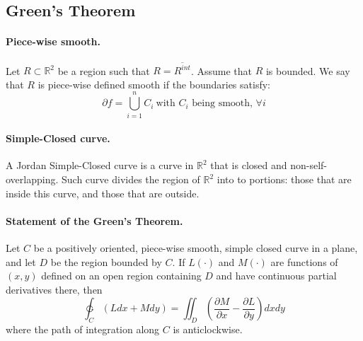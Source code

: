 \documentclass[11pt]{article}
\newcommand{\real}[0]{\mathbb{R}}
\begin{document}
\subsection{Green's Theorem}
\paragraph{Piece-wise smooth.}
Let $R\subset \real^2$ be a region such that $R = \overline{R^{int}}$. Assume that $R$ is bounded. We say that $R$ is piece-wise defined smooth if the boundaries satisfy:
\begin{equation*}
    \partial f = \bigcup_{i = 1}^n C_i~\text{with $C_i$ being smooth, $\forall i$}
\end{equation*}

\paragraph{Simple-Closed curve.}
A Jordan Simple-Closed curve is a curve in $\real^2$ that is closed and non-self-overlapping. Such curve divides the region of $\real^2$ into to portions: those that are inside this curve, and those that are outside.

\paragraph{Statement of the Green's Theorem.} Let $C$ be a positively oriented, piece-wise smooth, simple closed curve in a plane, and let $D$ be the region bounded by $C$. If $L(\cdot)$ and $M(\cdot)$ are functions of $(x, y)$ defined on an open region containing $D$ and have continuous partial derivatives there, then
\begin{equation*}
    \ointctrclockwise_C \left(Ldx + Mdy\right) = \iint_D \left(\frac{\partial M}{\partial x} - \frac{\partial L}{\partial y}\right) dxdy
\end{equation*}
where the path of integration along $C$ is anticlockwise.
\end{document}
